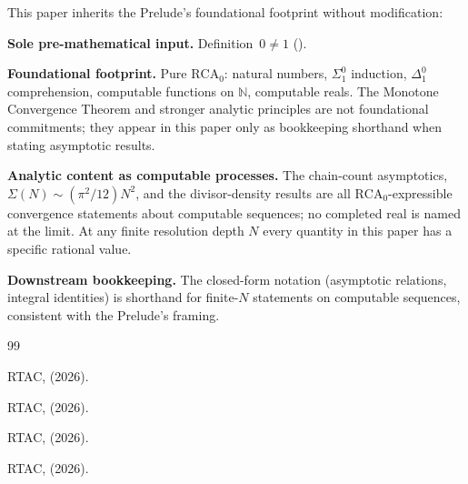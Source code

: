 \documentclass[11pt,a4paper]{article}
\begin{document}
This paper inherits the Prelude's foundational footprint without
modification:

\textbf{Sole pre-mathematical input.} Definition~$0 \neq 1$
().

\textbf{Foundational footprint.} Pure $\mathrm{RCA}_0$: natural
numbers, $\Sigma^0_1$ induction, $\Delta^0_1$ comprehension,
computable functions on $\mathbb{N}$, computable reals. The Monotone
Convergence Theorem and stronger analytic principles are not
foundational commitments; they appear in this paper only as
bookkeeping shorthand when stating asymptotic results.

\textbf{Analytic content as computable processes.} The chain-count
asymptotics, $\Sigma(N) \sim (\pi^2/12) N^2$, and the divisor-density
results are all $\mathrm{RCA}_0$-expressible convergence statements
about computable sequences; no completed real is named at the limit.
At any finite resolution depth $N$ every quantity in this paper has
a specific rational value.

\textbf{Downstream bookkeeping.} The closed-form notation
(asymptotic relations, integral identities) is shorthand for
finite-$N$ statements on computable sequences, consistent with the
Prelude's framing.

\bigskip

\begin{thebibliography}{99}

 RTAC,  (2026).

 RTAC,  (2026).

 RTAC,  (2026).

 RTAC,  (2026).

\end{thebibliography}
\end{document}
